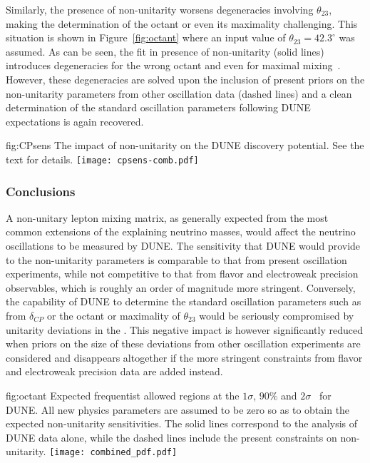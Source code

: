Similarly, the presence of non-unitarity worsens degeneracies involving $\theta_{23}$, making the determination of the octant or even its maximality challenging.
This situation is shown in Figure~\ref{fig:octant} where an input value of $\theta_{23} = 42.3^\circ$ was assumed. As can be seen, the fit in presence of non-unitarity (solid lines) introduces degeneracies for the wrong octant and even for maximal mixing~\cite{Blennow:2016jkn}. However, these degeneracies are solved upon the inclusion of present priors on the non-unitarity parameters from other oscillation data (dashed lines) and a clean determination of the standard oscillation parameters following DUNE expectations is again recovered.   

\begin{dunefigure}
{fig:CPsens}
{The impact of non-unitarity on the DUNE  discovery potential. See the text for details.}
 \texttt{[image: cpsens-comb.pdf]}
\end{dunefigure}

\subsubsection{Conclusions}
A non-unitary lepton mixing matrix, as generally expected from the most common extensions of the   explaining neutrino masses, would affect the neutrino oscillations to be measured by DUNE. The sensitivity that DUNE would provide to the non-unitarity parameters is comparable to that from present oscillation experiments, while not competitive to that from flavor and electroweak precision observables, which is roughly an order of magnitude more stringent. Conversely, the capability of DUNE to determine the standard oscillation parameters such as  from $\delta_{CP}$ or the octant or maximality of $\theta_{23}$ would be seriously compromised by unitarity deviations in the . This negative impact is however significantly reduced when priors on the size of these deviations from other oscillation experiments are considered and disappears altogether if the more stringent constraints from flavor and electroweak precision data are added instead.

\begin{dunefigure}
{fig:octant}
{Expected frequentist allowed regions at the $1 \sigma$, $90\%$ and $2\sigma$ \ for DUNE. All new physics parameters are assumed to be zero so as to obtain the expected non-unitarity sensitivities. The solid lines correspond to the analysis of DUNE data alone, while the dashed lines include the present constraints on non-unitarity.}
 \texttt{[image: combined\_pdf.pdf]} 
\end{dunefigure}

